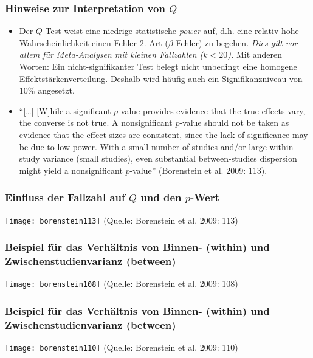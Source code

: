 \begin{frame}
  \frametitle{Hinweise zur Interpretation von $Q$}
  \begin{small}
    \begin{itemize}[<+->]
    \item Der $Q$-Test weist eine niedrige statistische \emph{power} auf, d.h. eine relativ hohe Wahrscheinlichkeit
      einen Fehler 2. Art ($\beta$-Fehler) zu begehen. \emph{Dies gilt vor allem für Meta-Analysen mit kleinen
        Fallzahlen ($k<20$).} Mit anderen Worten: Ein nicht-signifikanter Test belegt nicht unbedingt eine homogene
      Effektstärkenverteilung. Deshalb wird häufig auch ein Signifikanzniveau von $10\%$ angesetzt.

    \item "`[\ldots] [W]hile a significant $p$-value provides evidence that the true effects vary, the converse is not
      true. A nonsignificant $p$-value should not be taken as evidence that the effect sizes are consistent, since the
      lack of significance may be due to low power. With a small number of studies and/or large within-study variance
      (small studies), even substantial between-studies dispersion might yield a nonsignificant $p$-value"' (Borenstein
      et al. 2009: 113).
    \end{itemize}
  \end{small}
\end{frame}

\begin{frame}[shrink = 5]
  \frametitle{Einfluss der Fallzahl auf $Q$ und den $p$-Wert }
  \texttt{[image: borenstein113]}
\newline(Quelle: Borenstein et al. 2009: 113)
\end{frame}


\begin{frame}[shrink = 5]
  \frametitle{Beispiel für das Verhältnis von Binnen- (within) und Zwischenstudienvarianz (between)}
  \texttt{[image: borenstein108]}
\newline(Quelle: Borenstein et al. 2009: 108)
\end{frame}


\begin{frame}[shrink = 5]
  \frametitle{Beispiel für das Verhältnis von Binnen- (within) und Zwischenstudienvarianz (between)}\label{q-werte}
  \texttt{[image: borenstein110]}
\newline(Quelle: Borenstein et al. 2009: 110)
\end{frame}

